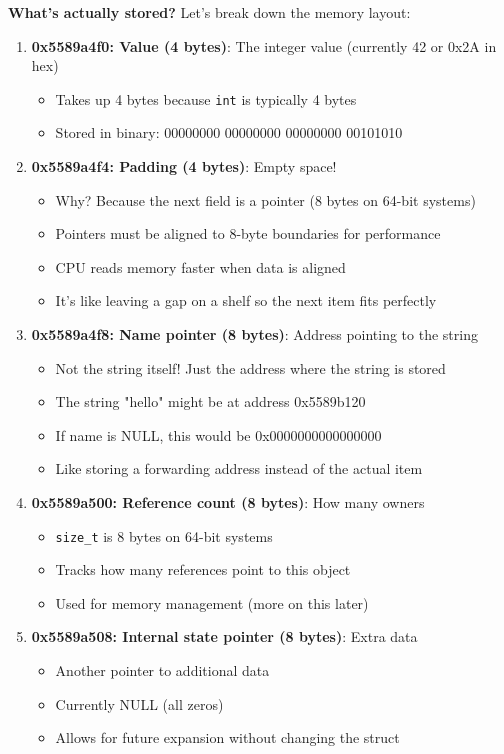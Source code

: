 \textbf{What's actually stored?} Let's break down the memory layout:

\begin{enumerate}
    \item \textbf{0x5589a4f0: Value (4 bytes)}: The integer value (currently 42 or 0x2A in hex)
    \begin{itemize}
        \item Takes up 4 bytes because \texttt{int} is typically 4 bytes
        \item Stored in binary: 00000000 00000000 00000000 00101010
    \end{itemize}

    \item \textbf{0x5589a4f4: Padding (4 bytes)}: Empty space!
    \begin{itemize}
        \item Why? Because the next field is a pointer (8 bytes on 64-bit systems)
        \item Pointers must be aligned to 8-byte boundaries for performance
        \item CPU reads memory faster when data is aligned
        \item It's like leaving a gap on a shelf so the next item fits perfectly
    \end{itemize}

    \item \textbf{0x5589a4f8: Name pointer (8 bytes)}: Address pointing to the string
    \begin{itemize}
        \item Not the string itself! Just the address where the string is stored
        \item The string "hello" might be at address 0x5589b120
        \item If name is NULL, this would be 0x0000000000000000
        \item Like storing a forwarding address instead of the actual item
    \end{itemize}

    \item \textbf{0x5589a500: Reference count (8 bytes)}: How many owners
    \begin{itemize}
        \item \texttt{size\_t} is 8 bytes on 64-bit systems
        \item Tracks how many references point to this object
        \item Used for memory management (more on this later)
    \end{itemize}

    \item \textbf{0x5589a508: Internal state pointer (8 bytes)}: Extra data
    \begin{itemize}
        \item Another pointer to additional data
        \item Currently NULL (all zeros)
        \item Allows for future expansion without changing the struct
    \end{itemize}
\end{enumerate}

